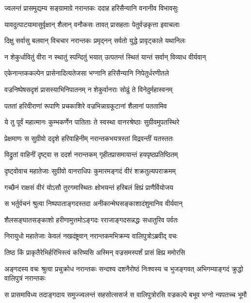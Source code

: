 \twolineshloka
{ज्वलन्तं प्रासमुद्यम्य सङ्ग्रामाग्रे नरान्तकः}
{ददाह हरिसैन्यानि वनानीव विभावसुः} %

\twolineshloka
{यावदुत्पाटयामासुर्वृक्षान् शैलान् वनौकसः}
{तावत् प्रासहताः पेतुर्वज्रकृत्ता इवाचलाः} %

\twolineshloka
{दिक्षु सर्वासु बलवान् विचचार नरान्तकः}
{प्रमृद्नन् सर्वतो युद्धे प्रावृट्काले यथानिलः} %

\twolineshloka
{न शेकुर्धावितुं वीरा न स्थातुं स्पन्दितुं भयात्}
{उत्पतन्तं स्थितं यान्तं सर्वान् विव्याध वीर्यवान्} %

\twolineshloka
{एकेनान्तककल्पेन प्रासेनादित्यतेजसा}
{भग्नानि हरिसैन्यानि निपेतुर्धरणीतले} %

\twolineshloka
{वज्रनिष्पेषसदृशं प्रासस्याभिनिपातनम्}
{न शेकुर्वानराः सोढुं ते विनेदुर्महास्वनम्} %

\twolineshloka
{पततां हरिवीराणां रूपाणि प्रचकाशिरे}
{वज्रभिन्नाग्रकूटानां शैलानां पततामिव} %

\twolineshloka
{ये तु पूर्वं महात्मानः कुम्भकर्णेन पातिताः}
{ते स्वस्था वानरश्रेष्ठाः सुग्रीवमुपतस्थिरे} %

\twolineshloka
{प्रेक्षमाणः स सुग्रीवो ददृशे हरिवाहिनीम्}
{नरान्तकभयत्रस्तां विद्रवन्तीं यतस्ततः} %

\twolineshloka
{विद्रुतां वाहिनीं दृष्ट्वा स ददर्श नरान्तकम्}
{गृहीतप्रासमायान्तं हयपृष्ठप्रतिष्ठितम्} %

\twolineshloka
{दृष्ट्वोवाच महातेजाः सुग्रीवो वानराधिपः}
{कुमारमङ्गदं वीरं शक्रतुल्यपराक्रमम्} %

\twolineshloka
{गच्छैनं राक्षसं वीरं योऽसौ तुरगमास्थितः}
{क्षोभयन्तं हरिबलं क्षिप्रं प्राणैर्वियोजय} %

\twolineshloka
{स भर्तुर्वचनं श्रुत्वा निष्पपाताङ्गदस्तदा}
{अनीकान्मेघसङ्काशादंशुमानिव वीर्यवान्} %

\twolineshloka
{शैलसङ्घातसङ्काशो हरीणामुत्तमोऽङ्गदः}
{रराजाङ्गदसन्नद्धः सधातुरिव पर्वतः} %

\twolineshloka
{निरायुधो महातेजाः केवलं नखदंष्ट्रवान्}
{नरान्तकमभिक्रम्य वालिपुत्रोऽब्रवीद् वचः} %

\twolineshloka
{तिष्ठ किं प्राकृतैरेभिर्हरिभिस्त्वं करिष्यसि}
{अस्मिन् वज्रसमस्पर्शं प्रासं क्षिप्र ममोरसि} %

\threelineshloka
{अङ्गदस्य वचः श्रुत्वा प्रचुक्रोध नरान्तकः}
{सन्दश्य दशनैरोष्ठं निःश्वस्य च भुजङ्गवत्}
{अभिगम्याङ्गदं क्रुद्धो वालिपुत्रं नरान्तकः} %

\twolineshloka
{स प्रासमाविध्य तदाङ्गदाय समुज्ज्वलन्तं सहसोत्ससर्ज}
{स वालिपुत्रोरसि वज्रकल्पे बभूव भग्नो न्यपतच्च भूमौ} %

